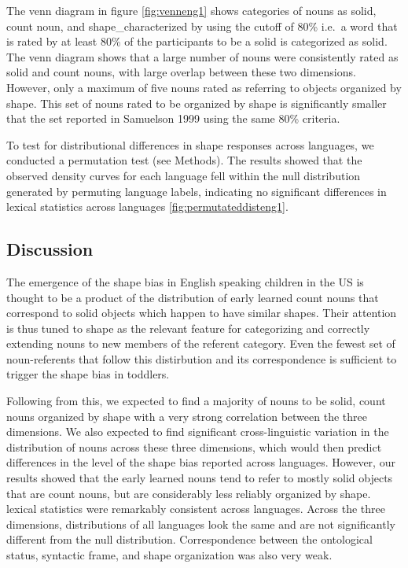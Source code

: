 \documentclass[
  american,
  man,floatsintext]{apa6}
\begin{document}
The venn diagram in figure \ref{fig:venneng1} shows categories of nouns as solid, count noun, and shape\_characterized by using the cutoff of 80\% i.e.~a word that is rated by at least 80\% of the participants to be a solid is categorized as solid. The venn diagram shows that a large number of nouns were consistently rated as solid and count nouns, with large overlap between these two dimensions. However, only a maximum of five nouns rated as referring to objects organized by shape. This set of nouns rated to be organized by shape is significantly smaller that the set reported in Samuelson 1999 using the same 80\% criteria.

To test for distributional differences in shape responses across languages, we conducted a permutation test (see Methods). The results showed that the observed density curves for each language fell within the null distribution generated by permuting language labels, indicating no significant differences in lexical statistics across languages \ref{fig:permutateddisteng1}.

\subsection{Discussion}\label{discussion}

The emergence of the shape bias in English speaking children in the US is thought to be a product of the distribution of early learned count nouns that correspond to solid objects which happen to have similar shapes. Their attention is thus tuned to shape as the relevant feature for categorizing and correctly extending nouns to new members of the referent category. Even the fewest set of noun-referents that follow this distirbution and its correspondence is sufficient to trigger the shape bias in toddlers.

Following from this, we expected to find a majority of nouns to be solid, count nouns organized by shape with a very strong correlation between the three dimensions. We also expected to find significant cross-linguistic variation in the distribution of nouns across these three dimensions, which would then predict differences in the level of the shape bias reported across languages. However, our results showed that the early learned nouns tend to refer to mostly solid objects that are count nouns, but are considerably less reliably organized by shape.
lexical statistics were remarkably consistent across languages. Across the three dimensions, distributions of all languages look the same and are not significantly different from the null distribution.
Correspondence between the ontological status, syntactic frame, and shape organization was also very weak.
\end{document}
